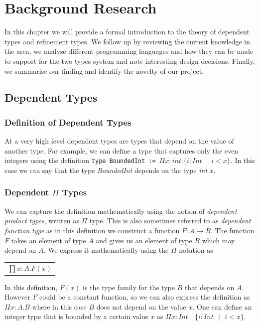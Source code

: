 \documentclass[a4paper,12pt]{report}
\begin{document}
\chapter{Background Research} \label{chapter:background}
In this chapter we will provide a formal introduction to the theory of dependent 
types and refinement types. We follow up by reviewing the current knowledge 
in the area, we analyse different programming languages and how they can 
be made to support for the two types system and note interesting design 
decisions. Finally, we summarise our finding and identify the novelty of our 
project. 
 
\section{Dependent Types}

\subsection{Definition of Dependent Types}
At a very high level dependent types are types that depend on the value of 
another type. For example, we can define a type that captures only the even 
integers using the definition 
\verb|type BoundedInt := |$\Pi x : int.\{i : Int\text{ }\text{ } i < x\}$. 
In this case we can say that the type \textit{BoundedInt} depends on the 
type \textit{int} $x$.

\subsection{Dependent $\Pi$ Types}
We can capture the definition mathematically using the notion of \textit{dependent 
product types}, written as $\Pi$ type. This is also sometimes referred to as 
\textit{dependent function type} as in this definition we construct a function 
$F: A \rightarrow B$. The function $F$ takes an element of type $A$ and 
gives us an element of type $B$ which may depend on $A$. We express it 
mathematically using the $\Pi$ notation as
\begin{center}
 \begin{tabular}{l}
   $\prod x: A.  F(x)$
 \end{tabular} 
\end{center}

In this definition, $F(x)$ is the type family for the type $B$ that depends on $A$.
However $F$ could be a constant function, so we can also express the definition 
as $\Pi x:A.B$ where in this case $B$ does not depend 
on the value $x$. One can define an integer type that is bounded by a certain 
value $x$ as $\Pi x:Int.\text{ }\{ i:Int\text{ }|\text{ }i < x\}$.
\end{document}
